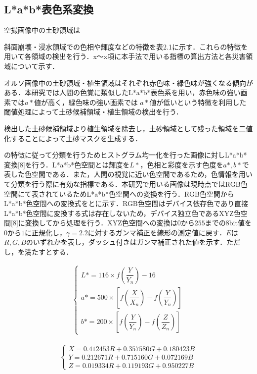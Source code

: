     \subsection{L*a*b*表色系変換}
      空撮画像中の土砂領域は




      斜面崩壊・浸水領域での色相や輝度などの特徴を表2.1に示す．これらの特徴を用いて各領域の検出を行う．x〜x項に本手法で用いる指標の算出方法と各災害領域について示す．

      オルソ画像中の土砂領域・植生領域はそれぞれ赤色味・緑色味が強くなる傾向がある．本研究では人間の色覚に類似したL*a*b*表色系を用い，赤色味の強い画素では$a*$値が高く，緑色味の強い画素では $a*$値が低いという特徴を利用した閾値処理によって土砂候補領域・植生領域の検出を行う．
      
      検出した土砂候補領域より植生領域を除去し，土砂領域として残った領域を二値化することによって土砂マスクを生成する．


      \tref{}の特徴に従って分類を行うためヒストグラム均一化を行った画像に対しL*a*b*変換[8]を行う．L*a*b*色空間とは輝度を$L*$，色相と彩度を示す色度を$a*,b*$で表した色空間である．また，人間の視覚に近い色空間であるため，色情報を用いて分類を行う際に有効な指標である．本研究で用いる画像は現時点ではRGB色空間にて表されているためL*a*b*色空間への変換を行う．RGB色空間からL*a*b*色空間への変換式をとに示す．RGB色空間はデバイス依存色であり直接L*a*b*色空間に変換する式は存在しないため，デバイス独立色であるXYZ色空間[8]に変換してから処理を行う．XYZ色空間への変換は$0$から$255$までの8bit値を$0$から$1$に正規化し，$γ=2.2$に対するガンマ補正を線形の測定値に戻す．$E$は$R,G,B$のいずれかを表し，ダッシュ付きはガンマ補正された値を示す．ただし，を満たすとする．

      \begin{eqnarray}
      \label{Lab表色系1}
        \left\{
          \begin{array}{l}
            L* = 116 \times f(\dfrac{Y} {Y_{n}}) - 16 \\
            a* = 500 \times [f(\dfrac{X} {X_{n}}) - f(\dfrac{Y} {Y_{n}})] \\
            b* = 200 \times [f(\dfrac{Y} {Y_{n}}) - f(\dfrac{Z} {Z_{n}})]
          \end{array}
        \right.
      \end{eqnarray}

      \begin{eqnarray}
        \label{Lab表色系2}
        \left\{
          \begin{array}{l}
            X = 0.412453R + 0.357580G + 0.180423B \\
            Y = 0.212671R + 0.715160G + 0.072169B \\
            Z = 0.019334R + 0.119193G + 0.950227B
          \end{array}
        \right.
      \end{eqnarray}

